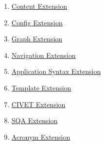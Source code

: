 \begin{enumerate}
\item 
\par \hyperref[content-extension]{Content Extension} 
\item 
\par \hyperref[config-extension]{Config Extension} 
\item 
\par \hyperref[graph-extension]{Graph Extension} 
\item 
\par \hyperref[navigation-extension]{Navigation Extension} 
\item 
\par \hyperref[application-syntax-extension]{Application Syntax Extension} 
\item 
\par \hyperref[template-extension]{Template Extension} 
\item 
\par \hyperref[civet-extension]{CIVET Extension} 
\item 
\par \hyperref[sqa-extension]{SQA Extension} 
\item 
\par \hyperref[acronym-extension]{Acronym Extension}
\end{enumerate}
